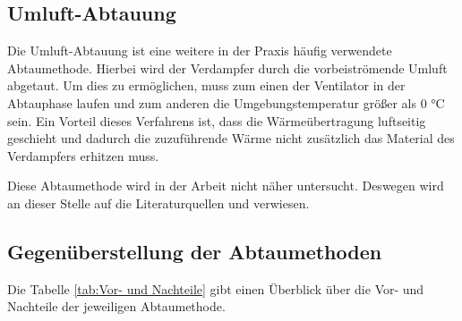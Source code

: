 \subsection*{Umluft-Abtauung}

Die Umluft-Abtauung ist eine weitere in der Praxis häufig verwendete Abtaumethode. Hierbei wird der Verdampfer durch die vorbeiströmende Umluft abgetaut. Um dies zu ermöglichen, muss zum einen der Ventilator in der Abtauphase laufen und zum anderen die Umgebungstemperatur größer als 0 °C sein. Ein Vorteil dieses Verfahrens ist, dass die Wärmeübertragung luftseitig geschieht und dadurch die zuzuführende Wärme nicht zusätzlich das Material des Verdampfers erhitzen muss. 

Diese Abtaumethode wird in der Arbeit nicht näher untersucht. Deswegen wird an dieser Stelle auf die  Literaturquellen \citep{Breidenbach2014} und \citep{Ehrbar2002} verwiesen. 

\subsection*{Gegenüberstellung der Abtaumethoden}
\label{subsec:Gegenüberstellung }

Die Tabelle \ref{tab:Vor- und Nachteile} gibt einen Überblick über die Vor- und Nachteile der jeweiligen Abtaumethode. 


